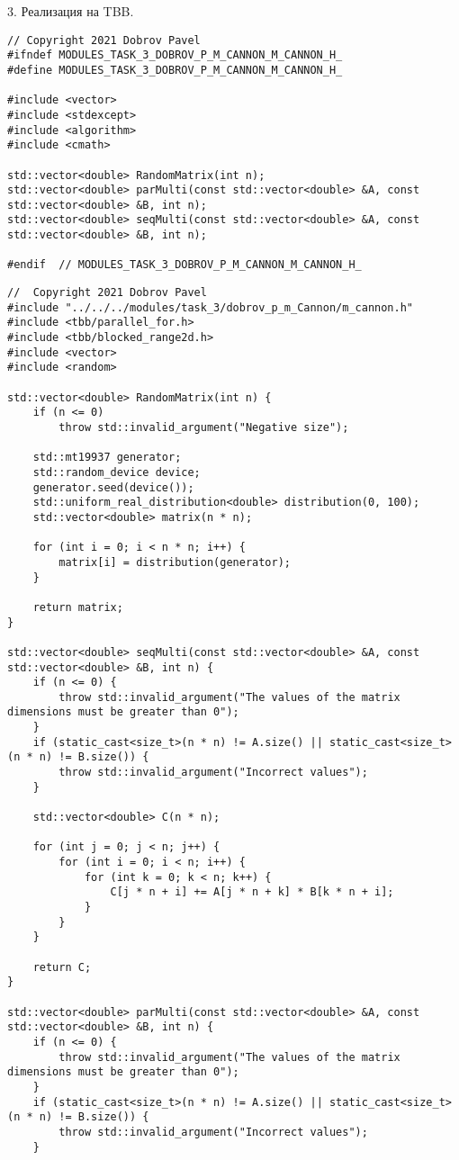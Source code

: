 \documentclass{report}
\begin{document}
\par 3. Реализация на TBB.
\begin{lstlisting}
// Copyright 2021 Dobrov Pavel
#ifndef MODULES_TASK_3_DOBROV_P_M_CANNON_M_CANNON_H_
#define MODULES_TASK_3_DOBROV_P_M_CANNON_M_CANNON_H_

#include <vector>
#include <stdexcept>
#include <algorithm>
#include <cmath>

std::vector<double> RandomMatrix(int n);
std::vector<double> parMulti(const std::vector<double> &A, const std::vector<double> &B, int n);
std::vector<double> seqMulti(const std::vector<double> &A, const std::vector<double> &B, int n);

#endif  // MODULES_TASK_3_DOBROV_P_M_CANNON_M_CANNON_H_
\end{lstlisting}
\begin{lstlisting}
//  Copyright 2021 Dobrov Pavel
#include "../../../modules/task_3/dobrov_p_m_Cannon/m_cannon.h"
#include <tbb/parallel_for.h>
#include <tbb/blocked_range2d.h>
#include <vector>
#include <random>

std::vector<double> RandomMatrix(int n) {
    if (n <= 0)
        throw std::invalid_argument("Negative size");

    std::mt19937 generator;
    std::random_device device;
    generator.seed(device());
    std::uniform_real_distribution<double> distribution(0, 100);
    std::vector<double> matrix(n * n);

    for (int i = 0; i < n * n; i++) {
        matrix[i] = distribution(generator);
    }

    return matrix;
}

std::vector<double> seqMulti(const std::vector<double> &A, const std::vector<double> &B, int n) {
    if (n <= 0) {
        throw std::invalid_argument("The values of the matrix dimensions must be greater than 0");
    }
    if (static_cast<size_t>(n * n) != A.size() || static_cast<size_t>(n * n) != B.size()) {
        throw std::invalid_argument("Incorrect values");
    }

    std::vector<double> C(n * n);

    for (int j = 0; j < n; j++) {
        for (int i = 0; i < n; i++) {
            for (int k = 0; k < n; k++) {
                C[j * n + i] += A[j * n + k] * B[k * n + i];
            }
        }
    }

    return C;
}

std::vector<double> parMulti(const std::vector<double> &A, const std::vector<double> &B, int n) {
    if (n <= 0) {
        throw std::invalid_argument("The values of the matrix dimensions must be greater than 0");
    }
    if (static_cast<size_t>(n * n) != A.size() || static_cast<size_t>(n * n) != B.size()) {
        throw std::invalid_argument("Incorrect values");
    }


\end{lstlisting}
\end{document}
